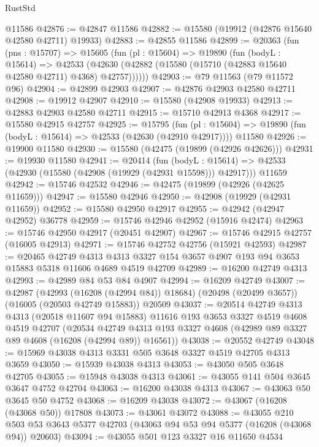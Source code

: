 \begin{lexlean}{RustStd}
\begin{coremodule}
    @11586
@42876 := @42847 @11586
@42882 := @15580 (@19912 (@42876 @15640 @42580 @42711) @19933)
@42883 := @42855 @11586
@42899 := @20363
    (fun (pns : @15707) =>
    @15605
      (fun (pl : @15604) =>
      @19890
        (fun (bodyL : @15614) =>
        @42533 (@42630 (@42882 (@15580 (@15710 (@42883 @15640 @42580 @42711) @4368) @42757))))))
@42903 := @79 @11563 (@79 @11572 @96)
@42904 := @42899 @42903
@42907 := @42876 @42903 @42580 @42711
@42908 := @19912 @42907
@42910 := @15580 (@42908 @19933)
@42913 := @42883 @42903 @42580 @42711
@42915 := @15710 @42913 @4368
@42917 := @15580 @42915 @42757
@42925 := @15795
    (fun (pl : @15604) => @19890 (fun (bodyL : @15614) => @42533 (@42630 (@42910 @42917))))
    @11580
@42926 := @19900 @11580
@42930 := @15580 (@42475 (@19899 (@42926 @42626)))
@42931 := @19930 @11580
@42941 := @20414
    (fun (bodyL : @15614) => @42533 (@42930 (@15580 (@42908 (@19929 (@42931 @15598))) @42917)))
    @11659
@42942 := @15746 @42532
@42946 := @42475 (@19899 (@42926 (@42625 @11659)))
@42947 := @15580 @42946
@42950 := @42908 (@19929 (@42931 @11659))
@42952 := @15580 @42950 @42917
@42955 := @42942 (@42947 @42952) @36778
@42959 := @15746 @42946 @42952 (@15916 @42474)
@42963 := @15746 @42950 @42917 (@20451 @42907)
@42967 := @15746 @42915 @42757 (@16005 @42913)
@42971 := @15746 @42752 @42756 (@15921 @42593)
@42987 := @20465
    @42749
    @4313
    @4313
    @3327
    @154
    @3657
    @4907
    @193
    @94
    @3653
    @15883
    @5318
    @11606
    @4689
    @4519
    @42709
@42989 := @16200 @42749 @4313
@42993 := @42989 @84 @53 @84 @4907
@42994 := @16209 @42749
@43007 := @42987
    (@42993 (@16208 (@42994 @84)) @18684)
    (@20498 (@20499 @3657))
    (@16005 (@20503 @42749 @15883))
    @20509
@43037 := @20514
    @42749
    @4313
    @4313
    (@20518 @11607 @94 @15883)
    @11616
    @193
    @3653
    @3327
    @4519
    @4608
    @4519
    @42707
    (@20534 @42749 @4313 @193 @3327 @4608 (@42989 @89 @3327 @89 @4608 (@16208 (@42994 @89)) @16561))
@43038 := @20552 @42749
@43048 := @15969 @43038 @4313 @3331 @505 @3648 @3327 @4519 @42705 @4313 @3659
@43050 := @15939 @43038 @4313
@43053 := @43050 @505 @3648 @42705
@43055 := @15948 @43038 @4313
@43061 := @43055 @141 @504 @3645 @3647 @4752 @42704
@43063 := @16200 @43038 @4313
@43067 := @43063 @50 @3645 @50 @4752
@43068 := @16209 @43038
@43072 := @43067 (@16208 (@43068 @50)) @17808
@43073 := @43061 @43072
@43088 := @43055
    @210
    @503
    @53
    @3643
    @5377
    @42703
    (@43063 @94 @53 @94 @5377 (@16208 (@43068 @94)) @20603)
@43094 := @43055 @501 @123 @3327 @16 @11650 @4534

\end{coremodule}
\end{lexlean}
